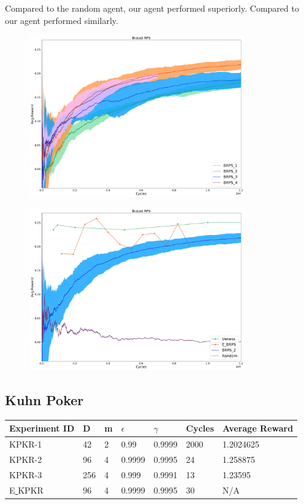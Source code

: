 \documentclass{article}
\theoremstyle{definition}
\newtheorem{primary statistics}[definition]{Primary Statistics}
\newtheorem{auxiliary statistics}[definition]{Auxiliary Statistics}
\begin{document}
Compared to the random agent, our agent performed superiorly. Compared to \citep{veness2011monte} our agent performed similarly.

 \begin{figure}[h]
 \centering
    \includegraphics[width=9.3cm]{4_Biased_RPS}
\end{figure}

\begin{figure}[h]
\centering
    \includegraphics[width=9.3cm]{Biased_RPS}
\end{figure}

\newpage

\subsection{Kuhn Poker}

\begin{tabular}{|l|l|l|l|l|l|l|}
\hline \centering 
  Experiment ID& D & m & $\epsilon$ & $\gamma$ & Cycles & Average Reward \\ \hline
KPKR-1  & 42        & 2           & 0.99        & 0.9999            & 2000   & 1.2024625        \\ \hline
KPKR-2  & 96        & 4           & 0.9999      & 0.9995            & 24     & 1.258875         \\ \hline
KPKR-3  & 256       & 4           & 0.999       & 0.9991            & 13     & 1.23595         \\ \hline
E\underline{ }KPKR  & 96       & 4           & 0.9999       & 0.9995            & 30     & N/A         \\ \hline
\end{tabular}
\end{document}
